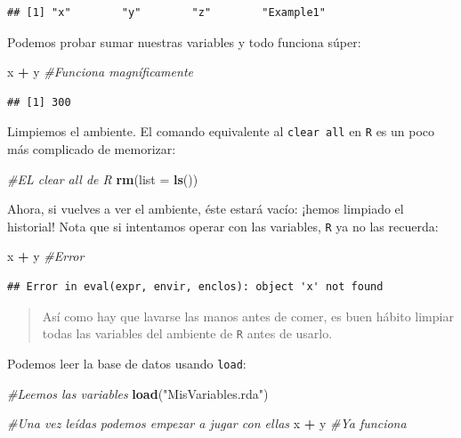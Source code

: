 \documentclass[
]{book}
\newenvironment{Shaded}{\begin{snugshade}}{\end{snugshade}}
\newcommand{\CommentTok}[1]{\textcolor[rgb]{0.56,0.35,0.01}{\textit{#1}}}
\newcommand{\DataTypeTok}[1]{\textcolor[rgb]{0.13,0.29,0.53}{#1}}
\newcommand{\KeywordTok}[1]{\textcolor[rgb]{0.13,0.29,0.53}{\textbf{#1}}}
\newcommand{\NormalTok}[1]{#1}
\newcommand{\OperatorTok}[1]{\textcolor[rgb]{0.81,0.36,0.00}{\textbf{#1}}}
\newcommand{\StringTok}[1]{\textcolor[rgb]{0.31,0.60,0.02}{#1}}
\begin{document}
\begin{verbatim}
## [1] "x"        "y"        "z"        "Example1"
\end{verbatim}

Podemos probar sumar nuestras variables y todo funciona súper:

\begin{Shaded}
\begin{Highlighting}[]
\NormalTok{x }\OperatorTok{+}\StringTok{ }\NormalTok{y }\CommentTok{#Funciona magníficamente}
\end{Highlighting}
\end{Shaded}

\begin{verbatim}
## [1] 300
\end{verbatim}

Limpiemos el ambiente. El comando equivalente al \texttt{clear\ all} en \texttt{R} es un poco más complicado de memorizar:

\begin{Shaded}
\begin{Highlighting}[]
\CommentTok{#EL clear all de R}
\KeywordTok{rm}\NormalTok{(}\DataTypeTok{list =} \KeywordTok{ls}\NormalTok{())}
\end{Highlighting}
\end{Shaded}

Ahora, si vuelves a ver el ambiente, éste estará vacío: ¡hemos limpiado el historial! Nota que si intentamos operar con las variables, \texttt{R} ya no las recuerda:

\begin{Shaded}
\begin{Highlighting}[]
\NormalTok{x }\OperatorTok{+}\StringTok{ }\NormalTok{y }\CommentTok{#Error}
\end{Highlighting}
\end{Shaded}

\begin{verbatim}
## Error in eval(expr, envir, enclos): object 'x' not found
\end{verbatim}

\begin{quote}
Así como hay que lavarse las manos antes de comer, es buen hábito limpiar todas las variables del ambiente de \texttt{R} antes de usarlo.
\end{quote}

Podemos leer la base de datos usando \texttt{load}:

\begin{Shaded}
\begin{Highlighting}[]
\CommentTok{#Leemos las variables}
\KeywordTok{load}\NormalTok{(}\StringTok{"MisVariables.rda"}\NormalTok{)}

\CommentTok{#Una vez leídas podemos empezar a jugar con ellas}
\NormalTok{x }\OperatorTok{+}\StringTok{ }\NormalTok{y }\CommentTok{#Ya funciona}
\end{Highlighting}
\end{Shaded}
\end{document}
